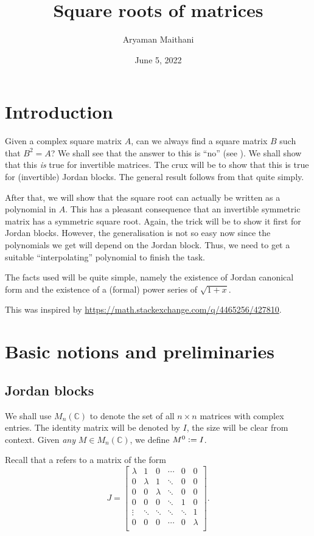\documentclass[12pt]{article}
\title{Square roots of matrices}
\author{Aryaman Maithani}
\date{June 5, 2022}
\begin{document}
\maketitle

\section{Introduction}

Given a complex square matrix $A$, can we always find a square matrix $B$ such that $B^{2} = A$? We shall see that the answer to this is ``no'' (see ). \newline
We shall show that this \emph{is} true for invertible matrices. The crux will be to show that this is true for (invertible) Jordan blocks. The general result follows from that quite simply. 

After that, we will show that the square root can actually be written as a polynomial in $A$. This has a pleasant consequence that an invertible symmetric matrix has a symmetric square root. Again, the trick will be to show it first for Jordan blocks. However, the generalisation is not so easy now since the polynomials we get will depend on the Jordan block. Thus, we need to get a suitable ``interpolating'' polynomial to finish the task.

The facts used will be quite simple, namely the existence of Jordan canonical form and the existence of a (formal) power series of $\sqrt{1 + x}$.

This was inspired by \url{https://math.stackexchange.com/q/4465256/427810}.

\section{Basic notions and preliminaries}
\subsection{Jordan blocks}

We shall use $M_{n}(\mathbb{C})$ to denote the set of all $n \times n$ matrices with complex entries. The identity matrix will be denoted by $I$, the size will be clear from context. \newline
Given \emph{any} $M \in M_{n}(\mathbb{C})$, we define $M^{0} \vcentcolon= I$. \newline


Recall that a  refers to a matrix of the form
\begin{equation*} 
	J = 
	\begin{bmatrix}
		\lambda & 1 & 0 & \cdots & 0 & 0 \\
		0 & \lambda & 1 & \ddots & 0 & 0 \\
		0 & 0 & \lambda & \ddots & 0 & 0 \\
		0 & 0 & 0 & \ddots & 1 & 0 \\
		\vdots & \ddots & \ddots & \ddots & \ddots & 1 \\
		0 & 0 & 0 & \cdots & 0 & \lambda \\
	\end{bmatrix}.
\end{equation*}
\end{document}
